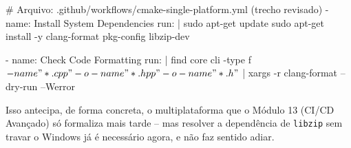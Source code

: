 \begin{CaixaInfo}[title={Compilando \texttt{libzip} em Windows e Linux}]
\begin{CaixaCodigo}
# Arquivo: .github/workflows/cmake-single-platform.yml (trecho revisado)
- name: Install System Dependencies
  run: |
    sudo apt-get update
    sudo apt-get install -y clang-format pkg-config libzip-dev

- name: Check Code Formatting
  run: |
    find core cli -type f \( -name "*.cpp" -o -name "*.hpp" -o -name "*.h" \) | xargs -r clang-format --dry-run --Werror
\end{CaixaCodigo}

Isso antecipa, de forma concreta, o multiplataforma que o Módulo 13 (CI/CD Avançado) só formaliza mais tarde -- mas resolver a dependência de \texttt{libzip} sem travar o Windows já é necessário agora, e não faz sentido adiar.
\end{CaixaInfo}

